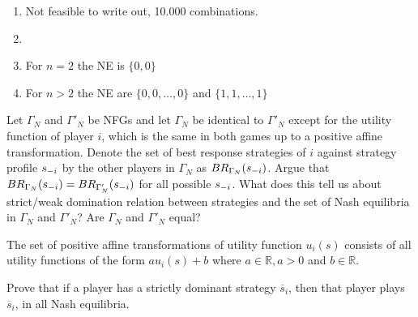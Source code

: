 \documentclass[../main.tex]{subfiles}
\begin{document}
\begin{solution}
	\begin{enumerate}
		\item Not feasible to write out, 10.000 combinations.
		\item 
		\item For $n=2$ the NE is $\{0,0\}$
		\item For $n>2$ the NE are $\{0,0,\dots,0\}$ and $\{1,1,\dots,1\}$
	\end{enumerate}
\end{solution}

\begin{question}
Let $\Gamma_N$ and $\Gamma'_N$ be NFGs and let $\Gamma_N$  be identical to $\Gamma'_N$ except for the utility function of player $i$, which is the same in both games up to a positive affine transformation.
Denote the set of best response strategies of $i$ against strategy profile $s_{\--i}$ by the other players in $\Gamma_N$  as $BR_{\Gamma_N}(s_{\--i})$.
Argue that $BR_{\Gamma_N}(s_{\--i}) = BR_{\Gamma'_N}(s_{\--i})$ for all possible $s_{\--i}$.
What does this tell us about strict/weak domination relation between strategies and the set of Nash equilibria in $\Gamma_N$ and $\Gamma'_N$? Are $\Gamma_N$ and $\Gamma'_N$ equal?

The set of positive affine transformations of utility function $u_i(s)$ consists of all utility functions of the form $au_i(s) + b$ where $a \in \mathbb{R}, a > 0$ and $b \in \mathbb{R}$.
\end{question}

\begin{solution}

\end{solution}

\begin{question}
	Prove that if a player has a strictly dominant strategy $\overline{s}_i$, then that player plays $\overline{s}_i$, in all Nash equilibria. 
\end{question}
\end{document}
